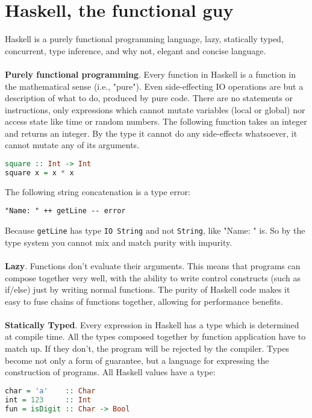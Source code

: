 \documentclass{report}
\theoremstyle{definition}
\theoremstyle{definition}
\begin{document}
\section{Haskell, the functional guy}
Haskell is a purely functional programming language, lazy, statically typed, concurrent, type inference, and why not, elegant and concise language.\\\\
\textbf{Purely functional programming}. Every function in Haskell is a function in the mathematical sense (i.e., "pure"). Even side-effecting IO operations are but a description of what to do, produced by pure code. There are no statements or instructions, only expressions which cannot mutate variables (local or global) nor access state like time or random numbers. The following function takes an integer and returns an integer. By the type it cannot do any side-effects whatsoever, it cannot mutate any of its arguments.
\begin{lstlisting}[language=Haskell, caption=Purely Functional Programming]
square :: Int -> Int
square x = x * x
\end{lstlisting}
The following string concatenation is a type error:
\begin{lstlisting}[caption=Purely Functional Programming]
"Name: " ++ getLine -- error
\end{lstlisting}
Because \texttt{getLine} has type \texttt{IO String} and not \texttt{String}, like "Name: " is. So by the type system you cannot mix and match purity with impurity.\\\\
\textbf{Lazy}. Functions don't evaluate their arguments. This means that programs can compose together very well, with the ability to write control constructs (such as if/else) just by writing normal functions. The purity of Haskell code makes it easy to fuse chains of functions together, allowing for performance benefits.\\\\
\textbf{Statically Typed}. Every expression in Haskell has a type which is determined at compile time. All the types composed together by function application have to match up. If they don't, the program will be rejected by the compiler. Types become not only a form of guarantee, but a language for expressing the construction of programs. All Haskell values have a type:
\begin{lstlisting}[language=Haskell, caption=Statically Typed]
char = 'a'    :: Char
int = 123     :: Int
fun = isDigit :: Char -> Bool
\end{lstlisting}
\end{document}
